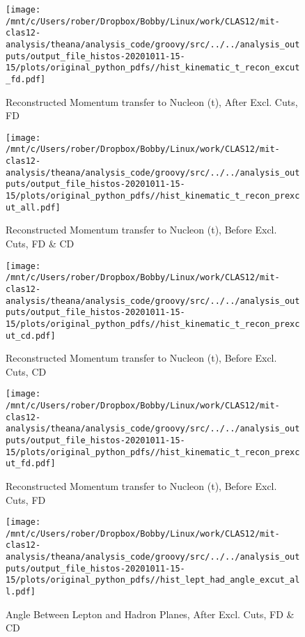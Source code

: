 \documentclass{article}
\begin{document}
\begin{landscape}
\begin{figure}[h]
        \texttt{[image: /mnt/c/Users/rober/Dropbox/Bobby/Linux/work/CLAS12/mit-clas12-analysis/theana/analysis\_code/groovy/src/../../analysis\_outputs/output\_file\_histos-20201011-15-15/plots/original\_python\_pdfs//hist\_kinematic\_t\_recon\_excut\_fd.pdf]}
        \captionsetup{textformat=empty,labelformat=blank}
        \caption{Reconstructed Momentum transfer to Nucleon (t), After Excl. Cuts, FD}
    \end{figure}
    \clearpage
    
    \begin{figure}[h]
        \centering

        \texttt{[image: /mnt/c/Users/rober/Dropbox/Bobby/Linux/work/CLAS12/mit-clas12-analysis/theana/analysis\_code/groovy/src/../../analysis\_outputs/output\_file\_histos-20201011-15-15/plots/original\_python\_pdfs//hist\_kinematic\_t\_recon\_prexcut\_all.pdf]}
        \captionsetup{textformat=empty,labelformat=blank}
        \caption{Reconstructed Momentum transfer to Nucleon (t), Before Excl. Cuts, FD \& CD}
    \end{figure}
    \clearpage
    
    \begin{figure}[h]
        \centering

        \texttt{[image: /mnt/c/Users/rober/Dropbox/Bobby/Linux/work/CLAS12/mit-clas12-analysis/theana/analysis\_code/groovy/src/../../analysis\_outputs/output\_file\_histos-20201011-15-15/plots/original\_python\_pdfs//hist\_kinematic\_t\_recon\_prexcut\_cd.pdf]}
        \captionsetup{textformat=empty,labelformat=blank}
        \caption{Reconstructed Momentum transfer to Nucleon (t), Before Excl. Cuts, CD}
    \end{figure}
    \clearpage
    
    \begin{figure}[h]
        \centering

        \texttt{[image: /mnt/c/Users/rober/Dropbox/Bobby/Linux/work/CLAS12/mit-clas12-analysis/theana/analysis\_code/groovy/src/../../analysis\_outputs/output\_file\_histos-20201011-15-15/plots/original\_python\_pdfs//hist\_kinematic\_t\_recon\_prexcut\_fd.pdf]}
        \captionsetup{textformat=empty,labelformat=blank}
        \caption{Reconstructed Momentum transfer to Nucleon (t), Before Excl. Cuts, FD}
    \end{figure}
    \clearpage
    
    \begin{figure}[h]
        \centering

        \texttt{[image: /mnt/c/Users/rober/Dropbox/Bobby/Linux/work/CLAS12/mit-clas12-analysis/theana/analysis\_code/groovy/src/../../analysis\_outputs/output\_file\_histos-20201011-15-15/plots/original\_python\_pdfs//hist\_lept\_had\_angle\_excut\_all.pdf]}
        \captionsetup{textformat=empty,labelformat=blank}
        \caption{Angle Between Lepton and Hadron Planes, After Excl. Cuts, FD \& CD}
    \end{figure}
    \clearpage
    

\end{landscape}
\end{document}
